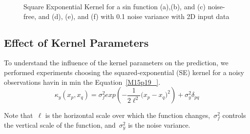 \documentclass[]{IEEEtran}
\begin{document}
\begin{figure}[H]
  \hspace{1mm}
  \hspace{1mm}
  \hspace{1mm}
  
  \caption{Square Exponential Kernel for a sin function (a),(b), and (c) noise-free, and (d), (e), and (f) with 0.1 noise variance with 2D input data}
  \label{2D_SE_sin}
\end{figure}\par



\subsection{Effect of Kernel Parameters}
To understand the influence of the kernel parameters on the prediction, we performed experiments choosing the  squared-exponential (SE) kernel for a noisy observations havin in min the Equation~\ref{M15p19_}.
\begin{equation}
{ \kappa  }_{ y }({ x }_{ p },{ x }_{ q })={ \sigma  }_{ f }^{ 2 }exp(-\frac { 1 }{ 2{ \ell  }^{ 2 } } { { ({ x }_{ p }-{ x }_{ q } }) }^{ 2 })+{ \sigma  }_{ y }^{ 2 }{ \delta  }_{ pq }
\label{M15p19_}
\end{equation}

Note that~\(\ell\) is the horizontal scale over which the function changes,~\({ \sigma  }_{ f }^{ 2 }\) controls the vertical scale of the function, and~\({ \sigma  }_{ y }^{ 2 }\) is the noise variance.\par
\end{document}
